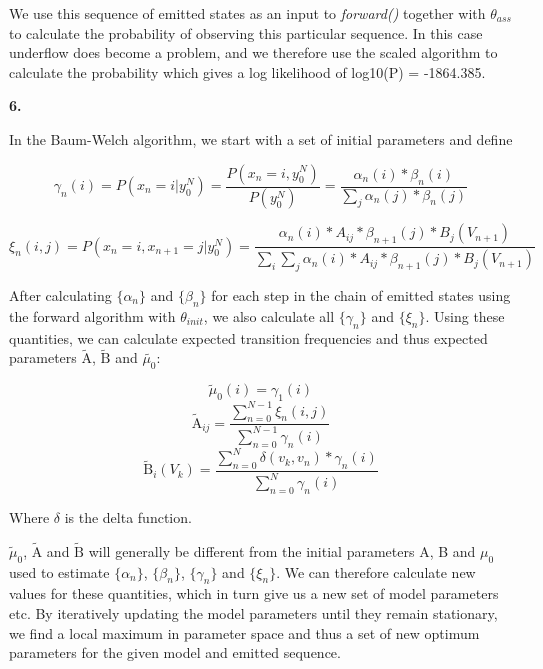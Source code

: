 \documentclass{article}
\begin{document}
We use this sequence of emitted states as an input to \textit{forward()} together with $\theta_{ass}$ to calculate the probability of observing this particular sequence. In this case underflow does become a problem, and we therefore use the scaled algorithm to calculate the probability which gives a log likelihood of
log10(P) = -1864.385.

\textbf{\large{6.}}

In the Baum-Welch algorithm, we start with a set of initial parameters and define

\begin{equation}
\gamma_n(i) = P(x_n=i | y_0^N) = \dfrac{P(x_n=i, y_0^N)}{P(y_0^N)} = \dfrac{\alpha_n(i) * \beta_n(i)}{\sum_j{\alpha_n(j) * \beta_n(j)}}
\end{equation}

\begin{equation}
\xi_n(i,j) = P(x_n=i , x_{n+1} = j| y_0^N) = \dfrac{\alpha_n(i) * A_{ij} * \beta_{n+1}(j) * B_j(V_{n+1})}{\sum_i{\sum_j{\alpha_n(i) * A_{ij} * \beta_{n+1}(j) * B_j(V_{n+1})}}}
\end{equation}

After calculating $\{\alpha_n\}$ and $\{\beta_n\}$ for each step in the chain of emitted states using the forward algorithm with $\theta_{init}$, we also calculate all $\{\gamma_n\}$ and $\{\xi_n\}$. Using these quantities, we can calculate expected transition frequencies and thus expected parameters $\tilde{\text{A}}$, $\tilde{\text{B}}$ and $\tilde{\mu_0}$:

\begin{equation}
\tilde{\mu}_0(i) = \gamma_1(i)
\end{equation}
\begin{equation}
\tilde{\text{A}}_{ij} = \dfrac{\sum_{n=0}^{N-1}{\xi_n(i,j)}}{\sum_{n=0}^{N-1}{\gamma_n(i)}}
\end{equation}
\begin{equation}
\tilde{\text{B}}_i(V_k) = \dfrac{\sum_{n=0}^{N}{\delta(v_k, v_n) * \gamma_n(i)}}{\sum_{n=0}^{N}{\gamma_n(i)}}
\end{equation}

Where $\delta$ is the delta function.

$\tilde{\mu}_0$, $\tilde{\text{A}}$ and $\tilde{\text{B}}$ will generally be different from the initial parameters A, B and $\mu_0$ used to estimate $\{\alpha_n\}$, $\{\beta_n\}$, $\{\gamma_n\}$ and $\{\xi_n\}$. We can therefore calculate new values for these quantities, which in turn give us a new set of model parameters etc. By iteratively updating the model parameters until they remain stationary, we find a local maximum in parameter space and thus a set of new optimum parameters for the given model and emitted sequence.
\end{document}
